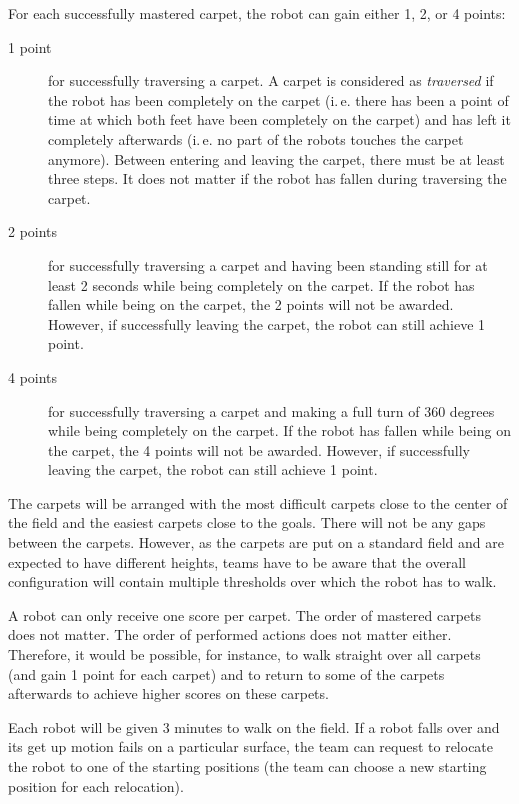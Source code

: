 \documentclass[12pt]{article}
\newcommand{\ie}{\mbox{i.\,e.}\xspace}
\begin{document}
For each successfully mastered carpet, the robot can gain either 1, 2, or 4 points: 

\begin{description}
\item[1 point] for successfully traversing a carpet. A carpet is considered as \textit{traversed} if the robot has been completely on the carpet (\ie there has been a point of time at which both feet have been completely on the carpet) and has left it completely afterwards (\ie no part of the robots touches the carpet anymore). Between entering and leaving the carpet, there must be at least three steps. It does not matter if the robot has fallen during traversing the carpet.
\item[2 points] for successfully traversing a carpet and having been standing still for at least 2 seconds while being completely on the carpet. If the robot has fallen while being on the carpet, the 2 points will not be awarded. However, if successfully leaving the carpet, the robot can still achieve 1 point.
\item[4 points] for successfully traversing a carpet and making a full turn of 360 degrees while being completely on the carpet. If the robot has fallen while being on the carpet, the 4 points will not be awarded. However, if successfully leaving the carpet, the robot can still achieve 1 point.
\end{description}

The carpets will be arranged with the most difficult carpets close to the center of the field and the easiest carpets close to the goals. There will not be any gaps between the carpets. However, as the carpets are put on a standard field and are expected to have different heights, teams have to be aware that the overall configuration will contain multiple thresholds over which the robot has to walk.

A robot can only receive one score per carpet. The order of mastered carpets does not matter. The order of performed actions does not matter either. Therefore, it would be possible, for instance, to walk straight over all carpets (and gain 1 point for each carpet) and to return to some of the carpets afterwards to achieve higher scores on these carpets.

Each robot will be given 3 minutes to walk on the field. If a robot falls over and its get up motion fails on a particular surface, the team can request to relocate the robot to one of the starting positions (the team can choose a new starting position for each relocation).
\end{document}
